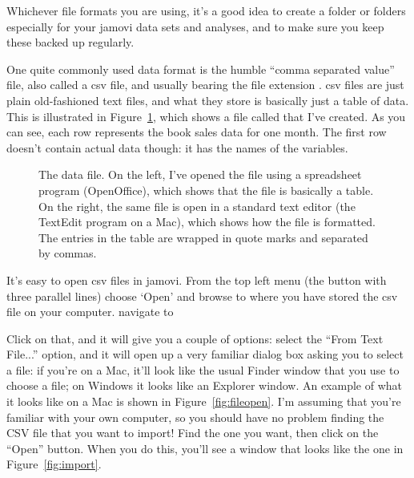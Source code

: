 Whichever file formats you are using, it's a good idea to create a folder or folders especially for your jamovi data sets and analyses, and to make sure you keep these backed up regularly. 


One quite commonly used data format is the humble ``comma separated value'' file, also called a csv file, and usually bearing the file extension . csv files are just plain old-fashioned text files, and what they store is basically just a table of data. This is illustrated in Figure~\ref{fig:booksalescsv}, which shows a file called  that I've created. As you can see, each row represents the book sales data for one month. The first row doesn't contain actual data though: it has the names of the variables.

\begin{figure}
\begin{center}
\caption{The  data file. On the left, I've opened the file using a spreadsheet program (OpenOffice), which shows that the file is basically a table. On the right, the same file is open in a standard text editor (the TextEdit program on a Mac), which shows how the file is formatted. The entries in the table are wrapped in quote marks and separated by commas.}
\HR
\label{fig:booksalescsv}
\end{center}
\end{figure} 

It's easy to open csv files in jamovi. From the top left menu (the button with three parallel lines) choose `Open' and browse to where you have stored the csv file on your computer. navigate to 




Click on that, and it will give you a couple of options: select the ``From Text File...'' option, and it will open up a very familiar dialog box asking you to select a file: if you're on a Mac, it'll look like the usual Finder window that you use to choose a file; on Windows it looks like an Explorer window. An example of what it looks like on a Mac is shown in Figure~\ref{fig:fileopen}. I'm assuming that you're familiar with your own computer, so you should have no problem finding the CSV file that you want to import! Find the one you want, then click on the ``Open'' button. When you do this, you'll see a window that looks like the one in Figure~\ref{fig:import}.

